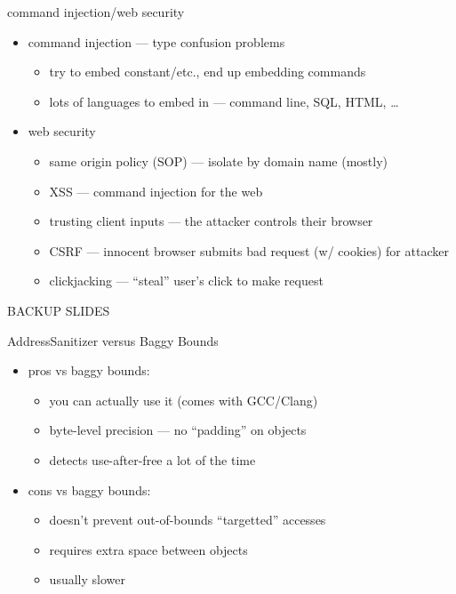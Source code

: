 \begin{frame}{command injection/web security}
    \begin{itemize}
        \item command injection --- type confusion problems
            \begin{itemize}
            \item try to embed constant/etc., end up embedding commands
            \item lots of languages to embed in --- command line, SQL, HTML, \ldots
            \end{itemize}
        \item web security
            \begin{itemize}
                \item same origin policy (SOP) --- isolate by domain name (mostly)
            \item XSS --- command injection for the web
            \item trusting client inputs --- the attacker controls their browser
            \item CSRF --- innocent browser submits bad request (w/ cookies) for attacker
            \item clickjacking --- ``steal'' user's click to make request
            \end{itemize}
    \end{itemize}
\end{frame}

\begin{frame}{BACKUP SLIDES}
\end{frame}


\begin{frame}{AddressSanitizer versus Baggy Bounds}
    \begin{itemize}
    \item pros vs baggy bounds:
        \begin{itemize}
        \item you can actually use it (comes with GCC/Clang)
        \item byte-level precision --- no ``padding'' on objects
        \item detects use-after-free a lot of the time
        \end{itemize}
    \item cons vs baggy bounds:
        \begin{itemize}
        \item doesn't prevent out-of-bounds ``targetted'' accesses
        \item requires extra space between objects
        \item usually slower
        \end{itemize}
    \end{itemize}
\end{frame}

